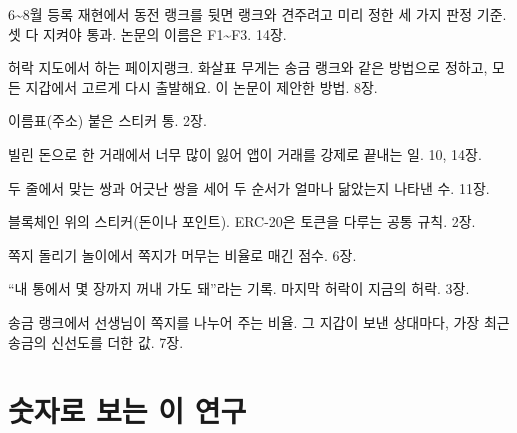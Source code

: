 \begin{description}[leftmargin=0pt, itemsep=0.35em, font=\normalfont\bfseries\color{inkblue}]
\item[약속 1\textasciitilde{}3] 6\textasciitilde{}8월 등록 재현에서 동전 랭크를 뒷면 랭크와 견주려고 미리 정한 세 가지 판정 기준. 셋 다 지켜야 통과. 논문의 이름은 F1\textasciitilde{}F3. 14장.
\item[엔도스랭크] 허락 지도에서 하는 페이지랭크. 화살표 무게는 송금 랭크와 같은 방법으로 정하고, 모든 지갑에서 고르게 다시 출발해요. 이 논문이 제안한 방법. 8장.
\item[지갑] 이름표(주소) 붙은 스티커 통. 2장.
\item[청산] 빌린 돈으로 한 거래에서 너무 많이 잃어 앱이 거래를 강제로 끝내는 일. 10, 14장.
\item[켄달의 타우 ($\tau$)] 두 줄에서 맞는 쌍과 어긋난 쌍을 세어 두 순서가 얼마나 닮았는지 나타낸 수. 11장.
\item[토큰] 블록체인 위의 스티커(돈이나 포인트). ERC-20은 토큰을 다루는 공통 규칙. 2장.
\item[페이지랭크] 쪽지 돌리기 놀이에서 쪽지가 머무는 비율로 매긴 점수. 6장.
\item[허락] “내 통에서 몇 장까지 꺼내 가도 돼”라는 기록. 마지막 허락이 지금의 허락. 3장.
\item[활발함] 송금 랭크에서 선생님이 쪽지를 나누어 주는 비율. 그 지갑이 보낸 상대마다, 가장 최근 송금의 신선도를 더한 값. 7장.
\end{description}

\chapter{숫자로 보는 이 연구}

